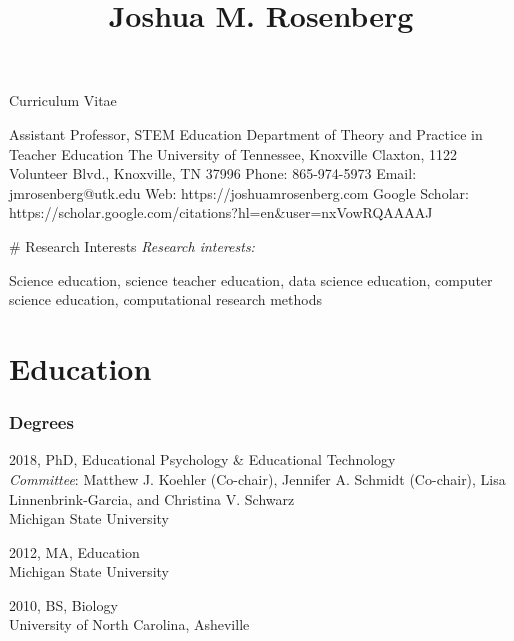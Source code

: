 \documentclass[
  11pt,
]{article}
\title{Joshua M. Rosenberg}
\author{}
\date{\vspace{-2.5em}}
\begin{document}
\maketitle

\begin{center} Curriculum Vitae




\hfill

Assistant Professor, STEM Education  \linebreak
Department of Theory and Practice in Teacher Education  \linebreak
The University of Tennessee, Knoxville   Claxton, 1122 Volunteer Blvd., Knoxville, TN 37996  \linebreak
Phone: 865-974-5973\linebreak
Email: jmrosenberg@utk.edu\linebreak
Web: https://joshuamrosenberg.com\linebreak
Google Scholar: https://scholar.google.com/citations?hl=en&user=nxVowRQAAAAJ  

# Research Interests
\emph{Research interests:} \end{center}

Science education, science teacher education, data science education,
computer science education, computational research methods

\hypertarget{education}{%
\section{Education}\label{education}}

\hypertarget{degrees}{%
\subsubsection{Degrees}\label{degrees}}

2018, PhD, Educational Psychology \& Educational Technology\\
\emph{Committee}: Matthew J. Koehler (Co-chair), Jennifer A. Schmidt
(Co-chair), Lisa Linnenbrink-Garcia, and Christina V. Schwarz\\
Michigan State University

2012, MA, Education\\
Michigan State University

2010, BS, Biology\\
University of North Carolina, Asheville
\end{document}
